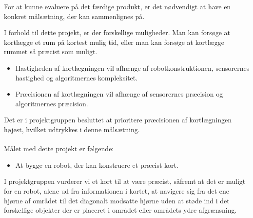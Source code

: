 For at kunne evaluere på det færdige produkt, er det nødvendigt at have en konkret målsætning, der kan sammenlignes på. 

I forhold til dette projekt, er der forskellige muligheder.
Man kan forsøge at kortlægge et rum på kortest mulig tid, eller man kan forsøge at kortlægge rummet så præcist som muligt.

\begin{itemize}
\item Hastigheden af kortlægningen vil afhænge af robotkonstruktionen, sensorernes hastighed og algoritmernes kompleksitet.
\item Præcisionen af kortlægningen vil afhænge af sensorernes præcision og algoritmernes præcision.
\end{itemize}
Det er i projektgruppen besluttet at prioritere præcisionen af kortlægningen højest, hvilket udtrykkes i denne målsætning.

\paragraph{}
\noindent Målet med dette projekt er følgende:
\begin{itemize}
\item At bygge en robot, der kan konstruere et præcist kort.
\end{itemize}
I projektgruppen vurderer vi et kort til at være præcist, såfremt at det er muligt for en robot, alene ud fra informationen i kortet, at navigere sig fra det ene hjørne af området til det diagonalt modsatte hjørne uden at støde ind i det forskellige objekter der er placeret i området eller områdets ydre afgrænsning.